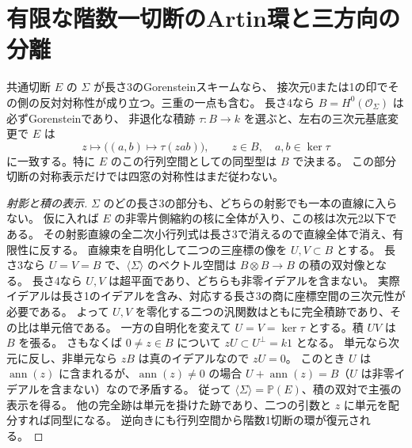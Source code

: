 \section{有限な階数一切断のArtin環と三方向の分離}
\label{sec:finite-marked-artin-secants}
\begin{theorem}\label{thm:finite-marked-artin-secants}
共通切断 $E$ の $\Sigma$ が長さ3のGorensteinスキームなら、
接次元0または1の印でその側の反対対称性が成り立つ。三重の一点も含む。
長さ4なら $B=H^0(\mathcal O_\Sigma)$ は必ずGorensteinであり、
非退化な積跡 $\tau:B\to k$ を選ぶと、左右の三次元基底変更で $E$ は
\[
       z\longmapsto \big((a,b)\longmapsto\tau(zab)\big),
       \qquad z\in B,\quad a,b\in\ker\tau
\]
に一致する。特に $E$ のこの行列空間としての同型型は $B$ で決まる。
この部分切断の対称表示だけでは四窓の対称性はまだ従わない。
\end{theorem}
\begin{proof}[射影と積の表示]
$\Sigma$ のどの長さ3の部分も、どちらの射影でも一本の直線に入らない。
仮に入れば $E$ の非零片側縮約の核に全体が入り、この核は次元2以下である。
その射影直線の全二次小行列式は長さ3で消えるので直線全体で消え、有限性に反する。
直線束を自明化して二つの三座標の像を $U,V\subset B$ とする。
長さ3なら $U=V=B$ で、$\langle\Sigma\rangle$ のベクトル空間は
$B\otimes B\to B$ の積の双対像となる。
長さ4なら $U,V$ は超平面であり、どちらも非零イデアルを含まない。
実際イデアルは長さ1のイデアルを含み、対応する長さ3の商に座標空間の三次元性が必要である。
よって $U,V$ を零化する二つの汎関数はともに完全積跡であり、その比は単元倍である。
一方の自明化を変えて $U=V=\ker\tau$ とする。積 $UV$ は $B$ を張る。
さもなくば $0\ne z\in B$ について $zU\subset U^\perp=k1$ となる。
単元なら次元に反し、非単元なら $zB$ は真のイデアルなので $zU=0$。
このとき $U$ は $\operatorname{ann}(z)$ に含まれるが、$\operatorname{ann}(z)\ne0$ の場合
$U+\operatorname{ann}(z)=B$（$U$ は非零イデアルを含まない）なので矛盾する。
従って $\langle\Sigma\rangle=\mathbb P(E)$、積の双対で主張の表示を得る。
他の完全跡は単元を掛けた跡であり、二つの引数と $z$ に単元を配分すれば同型になる。
逆向きにも行列空間から階数1切断の環が復元される。

\end{proof}
